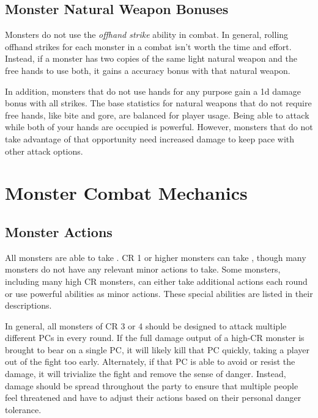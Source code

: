     \subsection{Monster Natural Weapon Bonuses}
        Monsters do not use the \textit{offhand strike} ability in combat.
        In general, rolling offhand strikes for each monster in a combat isn't worth the time and effort.
        Instead, if a monster has two copies of the same light natural weapon and the free hands to use both, it gains a  accuracy bonus with that natural weapon.

        In addition, monsters that do not use hands for any purpose gain a \plus1d damage bonus with all strikes.
        The base statistics for natural weapons that do not require free hands, like bite and gore, are balanced for player usage.
        Being able to attack while both of your hands are occupied is powerful.
        However, monsters that do not take advantage of that opportunity need increased damage to keep pace with other attack options.

\section{Monster Combat Mechanics}

    \subsection{Monster Actions}
        All monsters are able to take .
        CR 1 or higher monsters can take , though many monsters do not have any relevant minor actions to take.
        Some monsters, including many high CR monsters, can either take additional actions each round or use powerful abilities as minor actions.
        These special abilities are listed in their descriptions.

        In general, all monsters of CR 3 or 4 should be designed to attack multiple different PCs in every round.
        If the full damage output of a high-CR monster is brought to bear on a single PC, it will likely kill that PC quickly, taking a player out of the fight too early.
        Alternately, if that PC is able to avoid or resist the damage, it will trivialize the fight and remove the sense of danger.
        Instead, damage should be spread throughout the party to ensure that multiple people feel threatened and have to adjust their actions based on their personal danger tolerance.

